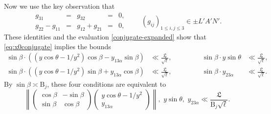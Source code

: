 \documentclass[11pt,oneside]{amsart}
\numberwithin{equation}{section}
\theoremstyle{remark}
\theoremstyle{plain}
\newcommand\BB{\mathrm{B}}
\renewcommand\leq{\leqslant}
\begin{document}
Now we use the key observation that
\[\begin{alignedat}{3}
g_{31}        &={} & g_{32}        &={} & 0,\\
g_{22}-g_{11} &={} & g_{12}+g_{21} &={} & 0,
\end{alignedat}
\qquad
(g_{ij})_{1\leq i,j\leq 3}\in\pm L'A'N'.\]
These identities and the evaluation \eqref{conjugate-expanded} show that \eqref{eq:x0conjugate} implies the bounds
\begin{equation}
\label{n3-four-conditions-1}
\begin{alignedat}{5}
\sin\beta\cdot ((y\cos\theta-1/y^2)\cos\beta-y_{13\alpha}\sin\beta)&\ll\frac{\mathfrak{L}}{\sqrt{\ell}},&\qquad&&
\sin\beta \cdot y\sin\theta&\ll\frac{\mathfrak{L}}{\sqrt{\ell}},\\
\sin\beta\cdot ((y\cos\theta-1/y^2)\sin\beta+y_{13\alpha}\cos\beta)&\ll\frac{\mathfrak{L}}{\sqrt{\ell}},&\qquad&&
\sin\beta \cdot y_{23\alpha}&\ll\frac{\mathfrak{L}}{\sqrt{\ell}}.
\end{alignedat}
\end{equation}
By $\sin \beta\asymp \BB_j$, these four conditions are equivalent to
\[
\left\|\begin{pmatrix}\cos\beta&-\sin\beta\\\sin\beta&\cos\beta\end{pmatrix}\begin{pmatrix}y\cos\theta-1/y^2\\y_{13\alpha}\end{pmatrix}\right\|,\,\,y\sin\theta,\,\,y_{23\alpha}\ll\frac{\mathfrak{L}}{\BB_j\sqrt{\ell}}.
\]
\end{document}

